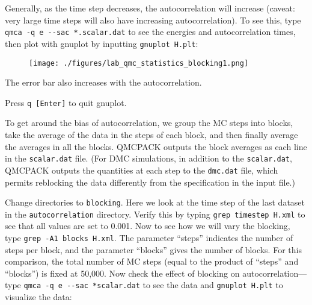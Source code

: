 Generally, as the time step decreases, the autocorrelation will increase
(caveat: very large time steps will also have increasing autocorrelation). To
see this, type \texttt{qmca -q e {-}{-}sac *.scalar.dat} to see the energies
and autocorrelation times, then plot with gnuplot by inputting \texttt{gnuplot
H.plt}:

\FloatBarrier
\begin{figure}[ht!]
\begin{center}
\texttt{[image: ./figures/lab\_qmc\_statistics\_blocking1.png]}
\end{center}
\end{figure}
\FloatBarrier


The error bar also increases with the autocorrelation.  

Press \texttt{q [Enter]} to quit gnuplot.

To get around the bias of autocorrelation, we group the MC steps into blocks,
take the average of the data in the steps of each block, and then finally
average the averages in all the blocks.  QMCPACK outputs the block averages as
each line in the \texttt{scalar.dat} file.  (For DMC simulations, in addition to the
\texttt{scalar.dat}, QMCPACK outputs the quantities at each step to the \texttt{dmc.dat} file,
which permits reblocking the data differently from the specification in the
input file.) 

Change directories to \texttt{blocking}.  Here we look at the time step of the
last dataset in the \texttt{autocorrelation} directory.  Verify this by typing
\texttt{grep timestep H.xml} to see that all values are set to 0.001.  Now to
see how we will vary the blocking, type \texttt{grep -A1 blocks H.xml}.  The
parameter ``steps'' indicates the number of steps per block, and the parameter
``blocks'' gives the number of blocks.  For this comparison, the total number
of MC steps (equal to the product of ``steps'' and ``blocks'') is fixed at
50,000.  Now check the effect of blocking on autocorrelation---type \texttt{qmca
-q e {-}{-}sac *scalar.dat} to see the data and \texttt{gnuplot H.plt} to
visualize the data:

